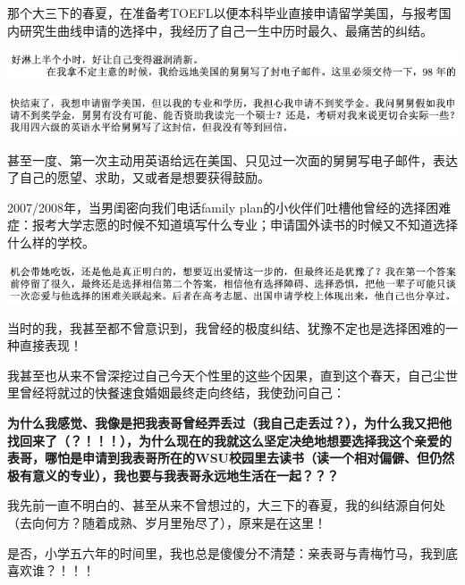 \documentclass[9pt, b5paper]{article}
\begin{document}
那个大三下的春夏，在准备考TOEFL以便本科毕业直接申请留学美国，与报考国内研究生曲线申请的选择中，我经历了自己一生中历时最久、最痛苦的纠结。

\begin{center}
\includegraphics[width=.9\linewidth]{./pic/backups_plans_20210423_091514.png}
\end{center}

\begin{center}
\includegraphics[width=.9\linewidth]{./pic/backups_plans_20210423_091638.png}
\end{center}

甚至一度、第一次主动用英语给远在美国、只见过一次面的舅舅写电子邮件，表达了自己的愿望、求助，又或者是想要获得鼓励。

2007/2008年，当男闺密向我们电话family plan的小伙伴们吐槽他曾经的选择困难症：报考大学志愿的时候不知道填写什么专业；申请国外读书的时候又不知道选择什么样的学校。

\begin{center}
\includegraphics[width=.9\linewidth]{./pic/backups_plans_20210422_221850.png}
\end{center}

当时的我，我甚至都不曾意识到，我曾经的极度纠结、犹豫不定也是选择困难的一种直接表现！

我甚至也从来不曾深挖过自己今天个性里的这些个因果，直到这个春天，自己尘世里曾经将就过的快餐速食婚姻最终走向终结，我使劲问自己：

\textbf{为什么我感觉、我像是把我表哥曾经弄丢过（我自己走丢过？），为什么我又把他找回来了（？！！！），为什么现在的我就这么坚定决绝地想要选择我这个亲爱的表哥，哪怕是申请到我表哥所在的WSU校园里去读书（读一个相对偏僻、但仍然极有意义的专业），我也要与我表哥永远地生活在一起？？？}

我先前一直不明白的、甚至从来不曾想过的，大三下的春夏，我的纠结源自何处（去向何方？随着成熟、岁月里殆尽了），原来是在这里！

是否，小学五六年的时间里，我也总是傻傻分不清楚：亲表哥与青梅竹马，我到底喜欢谁？！！！
\end{document}
